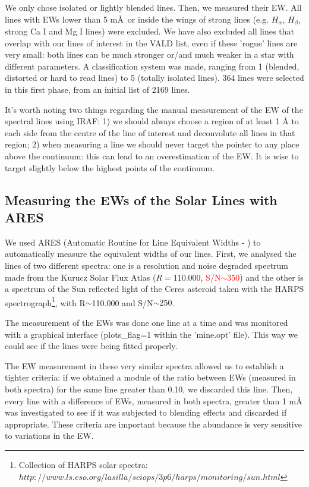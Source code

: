 \documentclass[dvips,12pt,a4paper]{report}
\begin{document}
{We only chose isolated or lightly blended lines. Then, we measured their EW. All lines with EWs lower than 5 m\AA\, or inside the wings of strong lines (e.g. $H_\alpha$, $H_\beta$, strong Ca I and Mg I lines) were excluded. We have also excluded all lines that overlap with our lines of interest in the VALD list, even if these 'rogue' lines are very small: both lines can be much stronger or/and much weaker in a star with different parameters. A classification system was made, ranging from 1 (blended, distorted or hard to read lines) to 5 (totally isolated lines). 364 lines were selected in this first phase, from an initial list of 2169 lines. 

It's worth noting two things regarding the manual measurement of the EW of the spectral lines using IRAF: 1) we should always choose a region of at least 1 \AA{} to each side from the centre of the line of interest and deconvolute all lines in that region; 2) when measuring a line we should never target the pointer to any place above the continuum: this can lead to an overestimation of the EW. It is wise to target slightly below the highest points of the continuum.

\subsection {Measuring the EWs of the Solar Lines with ARES}
\label{ARES}
We used ARES (Automatic Routine for Line Equivalent Widths - \citeauthor{Sousa-2007} \citeyear{Sousa-2007}) to automatically measure the equivalent widths of our lines. First, we analysed the lines of two different spectra: one is a resolution and noise degraded spectrum made from the Kurucz Solar Flux Atlas ($R=110.000$, \textcolor{red}{S/N$\sim350$}) and the other is a spectrum of the Sun reflected light of the Ceres asteroid taken with the HARPS spectrograph\footnote{Collection of HARPS solar spectra: $http://www.ls.eso.org/lasilla/sciops/3p6/harps/monitoring/sun.html$}, with R$\sim$110.000 and S/N$\sim250$. %



The measurement of the EWs was done one line at a time and was monitored with a graphical interface (plots\_flag=1 within the 'mine.opt' file). This way we could see if the lines were being fitted properly.

The EW measurement in these very similar spectra allowed us to establish a tighter criteria: if we obtained a module of the ratio between EWs (measured in both spectra) for the same line greater than 0.10, we  discarded this line. Then, every line with a difference of EWs, measured in both spectra, greater than 1 m\AA{} was investigated to see if it was subjected to blending effects and discarded if appropriate. These criteria are important because the abundance is very sensitive to variations in the EW. %

}
\end{document}
